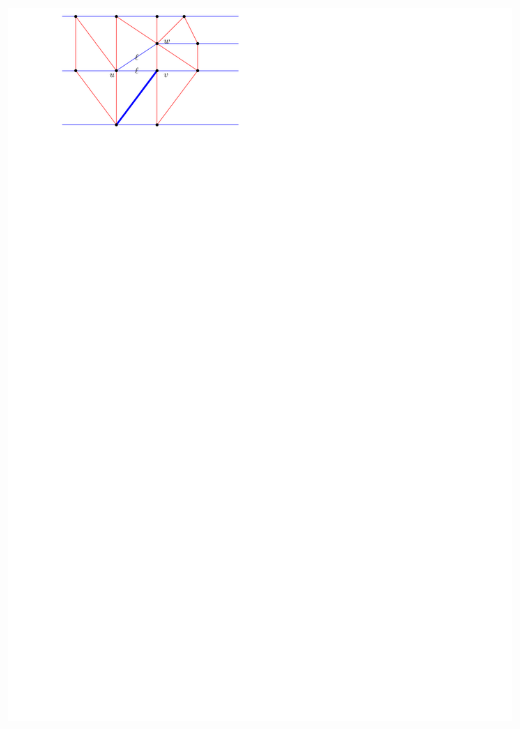 \documentclass[a4paper]{article}
\begin{document}
\includegraphics[scale=1]{./blueFaceSubdivision/img/puttingthroughLoad.pdf}
\clearpage%
\end{document}

